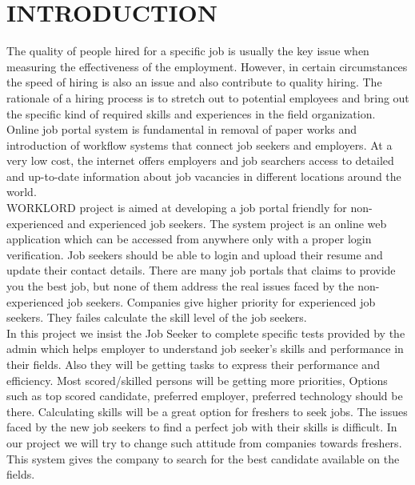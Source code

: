 \documentclass[a4paper,12pt]{report}
\begin{document}
\pagebreak

\chapter{INTRODUCTION}

\hspace*{12pt}The quality of people hired for a specific job is usually the key issue when measuring the effectiveness of the employment. However, in certain circumstances the speed of hiring is also an issue and also contribute to quality hiring. The rationale of a hiring process is to stretch out to potential employees and bring out the specific kind of required skills and experiences in the field organization. Online job portal system is fundamental in removal of paper works and introduction of workflow systems that connect job seekers and employers. At a very low cost, the internet offers employers and job searchers access to detailed and up-to-date information about job vacancies in different locations around the world. \\

WORKLORD project is aimed at developing a job portal friendly for non-experienced and experienced job seekers. The system project is an online web application which can be accessed from anywhere only with a proper login verification. Job seekers should be able to login and upload their resume and update their contact details. There are many job portals that claims to provide you the best job, but none of them address the real issues faced by the non-experienced job seekers. Companies give higher priority for experienced job seekers. They failes calculate the skill level of the job seekers. \\

 In this project we insist the Job Seeker to complete specific tests provided by the admin which helps employer to understand job seeker's skills and performance in their fields. Also they will be getting tasks to express their performance and efficiency. Most scored/skilled persons will be getting more priorities, Options such as top scored candidate, preferred employer, preferred technology should be there. Calculating skills will be a great option for freshers to seek jobs. The issues faced by the new job seekers to find a perfect job with their skills is difficult. In our project we will try to change such attitude from companies towards freshers. This system gives the company to search for the best candidate available on the fields.\\
\end{document}

